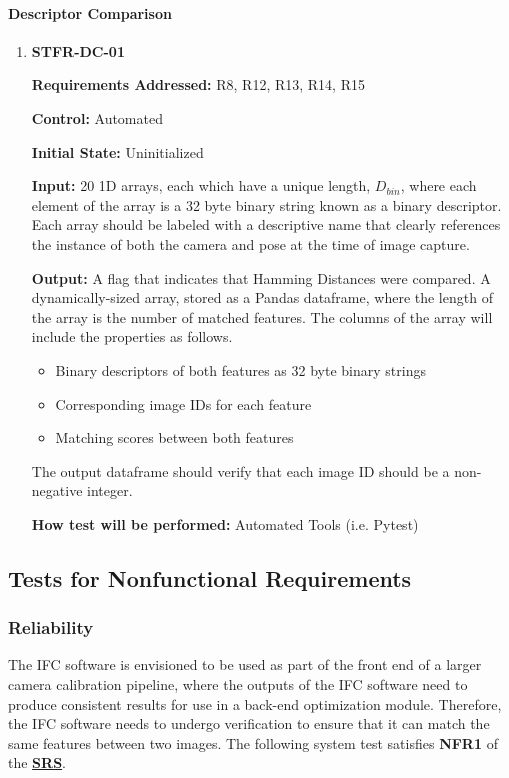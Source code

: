\documentclass[12pt, titlepage]{article}
\begin{document}
\paragraph{Descriptor Comparison}
\begin{enumerate}
\item \hypertarget{STFR-DC-01}{\textbf{STFR-DC-01}\\}
\textbf{Requirements Addressed:} R8, R12, R13, R14, R15

\textbf{Control:} Automated		

\textbf{Initial State:} Uninitialized

\textbf{Input:} 20 1D arrays, each which have a unique length, $D_{bin}$, where each element of the 
array is a 32 byte binary string known as a binary descriptor. Each array should be labeled with a 
descriptive name that clearly references the instance of both the camera and pose at the time of image 
capture.

\textbf{Output:} A flag that indicates that Hamming Distances were compared. 
A dynamically-sized array, stored as a Pandas dataframe, where the length of the array is the 
number of matched features. The columns of the array will include the properties as follows.
\begin{itemize}
\item Binary descriptors of both features as 32 byte binary strings
\item Corresponding image IDs for each feature
\item Matching scores between both features
\end{itemize}

The output dataframe should verify that each image ID should be a non-negative integer.

\textbf{How test will be performed:} Automated Tools (i.e. Pytest)
\end{enumerate}

\subsection{Tests for Nonfunctional Requirements}\label{NFR_Tests}
\subsubsection{Reliability}
The IFC software is envisioned to be used as part of the front end of a larger camera calibration pipeline, 
where the outputs of the IFC software need to produce consistent results for use in a back-end optimization 
module. Therefore, the IFC software needs to undergo verification to ensure that it can match the same 
features between two images. The following system test satisfies \textbf{NFR1} of the 
\textbf{\href{https://github.com/KiranSingh15/CAS-741-Image-Correspondences/blob/main/docs/SRS/SRS.pdf}
{SRS}}.
\end{document}
